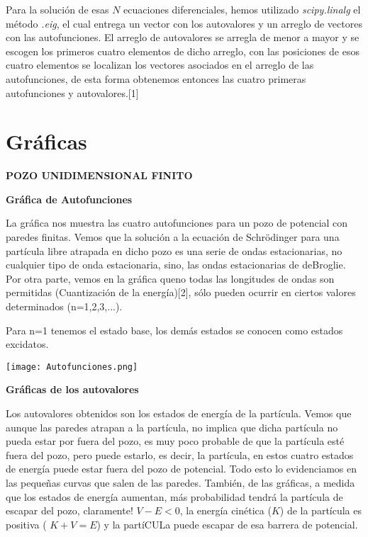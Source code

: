 \documentclass{article}
\begin{document}
\medskip

Para la solución de esas $N$ ecuaciones diferenciales, hemos utilizado \textit{scipy.linalg} el método \textit{.eig}, el cual entrega un vector con los autovalores y un arreglo de vectores con las autofunciones. El arreglo de autovalores se arregla de menor a mayor y se escogen los primeros cuatro elementos de dicho arreglo, con las posiciones de esos cuatro elementos se localizan los vectores asociados en el arreglo de las autofunciones, de esta forma obtenemos entonces las cuatro primeras autofunciones y autovalores.[1]

\medskip

\section{Gráficas} 

\textbf{POZO UNIDIMENSIONAL FINITO}

\medskip

\textbf{Gráfica de Autofunciones}

\medskip

La gráfica nos muestra las cuatro autofunciones para un pozo de potencial con paredes finitas. Vemos que la solución a la ecuación de Schrödinger para una partícula libre atrapada en dicho pozo es una serie de ondas estacionarias, no cualquier tipo de onda estacionaria, sino, las ondas estacionarias de deBroglie. Por otra parte, vemos en la gráfica queno todas las longitudes de ondas son permitidas (Cuantización de la energía)[2], sólo pueden ocurrir en ciertos valores determinados (n=1,2,3,...). 

Para n=1 tenemos el estado base, los demás estados se conocen como estados excidatos.

\medskip

\texttt{[image: Autofunciones.png]}

\textbf{Gráficas de los autovalores}

\medskip

Los autovalores obtenidos son los estados de energía de la partícula. Vemos que aunque las paredes atrapan a la partícula, no implica que dicha partícula no pueda estar por fuera del pozo, es muy poco probable de que la partícula esté fuera del pozo, pero puede estarlo, es decir, la partícula, en estos cuatro estados de energía puede estar fuera del pozo de potencial. Todo esto lo evidenciamos en las pequeñas curvas que salen de las paredes. También, de las gráficas, a medida que los estados de energía aumentan, más probabilidad tendrá la partícula de escapar del pozo, claramente! $V-E<0$, la energía cinética ($K$) de la partícula es positiva ( $K+V=E$) y la partíCULa puede escapar de esa barrera de potencial.
\end{document}
